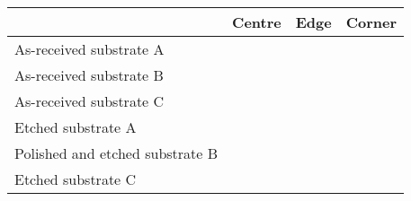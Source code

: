 


\begin{table}[htbp]
    \centering
    \caption[\Ac{rms} roughness of the substrates.]{}\label{tab:sub_rms-roughness}
    \begin{tabu} to 1.0\textwidth { X[3,r] X[1,c] X[1,c] X[1,c] }
    \hline
                                & \textbf{Centre}  & \textbf{Edge}    & \textbf{Corner}    \\
        \hline
        As-received substrate A & \SI{}{} & \SI{}{} & \SI{}{}   \\
        As-received substrate B & \SI{}{} & \SI{}{} & \SI{}{}   \\
        As-received substrate C & \SI{}{} & \SI{}{} & \SI{}{}   \\
        \hline
        Etched substrate A      & \SI{}{} & \SI{}{} & \SI{}{}   \\  
        Polished and etched substrate B & \SI{}{} & \SI{}{} & \SI{}{}   \\  
        Etched substrate C      & \SI{}{} & \SI{}{} & \SI{}{}   \\  
        \hline
    \end{tabu}
\end{table}

